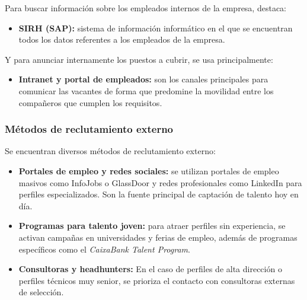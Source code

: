 Para buscar información sobre los empleados internos de la empresa, destaca:

\begin{itemize}
    \item \textbf{SIRH (SAP):} sistema de información informático en el que se encuentran todos los datos referentes a los empleados de la empresa.
\end{itemize} 

Y para anunciar internamente los puestos a cubrir, se usa principalmente:

\begin{itemize}
    \item \textbf{Intranet y portal de empleados:} son los canales principales para comunicar las vacantes de forma que predomine la movilidad entre los compañeros que cumplen los requisitos.
\end{itemize} 


\subsubsection{Métodos de reclutamiento externo}

Se encuentran diversos métodos de reclutamiento externo:

\begin{itemize}
    \item \textbf{Portales de empleo y redes sociales:} se utilizan portales de empleo masivos como InfoJobs o GlassDoor y redes profesionales como LinkedIn para perfiles especializados. Son la fuente principal de captación de talento hoy en día.
    \item \textbf{Programas para talento joven:} para atraer perfiles sin experiencia, se activan campañas en universidades y ferias de empleo, además de programas específicos como el \textit{CaixaBank Talent Program}.
    \item \textbf{Consultoras y headhunters:} En el caso de perfiles de alta dirección o perfiles técnicos muy senior, se prioriza el contacto con consultoras externas de selección.
\end{itemize} 

